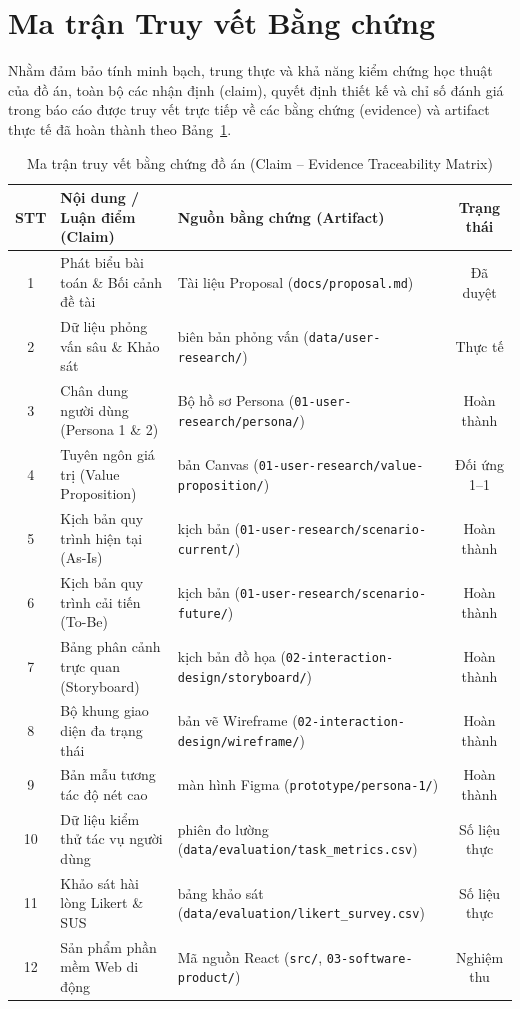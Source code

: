 \newpage
\appendix
\section{Ma trận Truy vết Bằng chứng}

Nhằm đảm bảo tính minh bạch, trung thực và khả năng kiểm chứng học thuật của đồ án, toàn bộ các nhận định (claim), quyết định thiết kế và chỉ số đánh giá trong báo cáo được truy vết trực tiếp về các bằng chứng (evidence) và artifact thực tế đã hoàn thành theo Bảng~\ref{tab:claim_evidence}.

\begin{table}[H]
\centering
\footnotesize
\setlength{\tabcolsep}{3.5pt}
\renewcommand{\arraystretch}{1.15}
\begin{tabularx}{\textwidth}{|c|>{\raggedright\arraybackslash}p{4.2cm}|>{\raggedright\arraybackslash}X|c|}
\hline
\textbf{STT} & \textbf{Nội dung / Luận điểm (Claim)} & \textbf{Nguồn bằng chứng (Artifact)} & \textbf{Trạng thái} \\ \hline
1 & Phát biểu bài toán \& Bối cảnh đề tài & Tài liệu Proposal (\texttt{docs/proposal.md}) & Đã duyệt \\ \hline
2 & Dữ liệu phỏng vấn sâu \& Khảo sát & 6 biên bản phỏng vấn (\texttt{data/user-research/}) & Thực tế \\ \hline
3 & Chân dung người dùng (Persona 1 \& 2) & Bộ hồ sơ Persona (\texttt{01-user-research/persona/}) & Hoàn thành \\ \hline
4 & Tuyên ngôn giá trị (Value Proposition) & 2 bản Canvas (\texttt{01-user-research/value-proposition/}) & Đối ứng 1--1 \\ \hline
5 & Kịch bản quy trình hiện tại (As-Is) & 7 kịch bản (\texttt{01-user-research/scenario-current/}) & Hoàn thành \\ \hline
6 & Kịch bản quy trình cải tiến (To-Be) & 7 kịch bản (\texttt{01-user-research/scenario-future/}) & Hoàn thành \\ \hline
7 & Bảng phân cảnh trực quan (Storyboard) & 4 kịch bản đồ họa (\texttt{02-interaction-design/storyboard/}) & Hoàn thành \\ \hline
8 & Bộ khung giao diện đa trạng thái & 32 bản vẽ Wireframe (\texttt{02-interaction-design/wireframe/}) & Hoàn thành \\ \hline
9 & Bản mẫu tương tác độ nét cao & 20 màn hình Figma (\texttt{prototype/persona-1/}) & Hoàn thành \\ \hline
10 & Dữ liệu kiểm thử tác vụ người dùng & 20 phiên đo lường (\texttt{data/evaluation/task\_metrics.csv}) & Số liệu thực \\ \hline
11 & Khảo sát hài lòng Likert \& SUS & 5 bảng khảo sát (\texttt{data/evaluation/likert\_survey.csv}) & Số liệu thực \\ \hline
12 & Sản phẩm phần mềm Web di động & Mã nguồn React (\texttt{src/}, \texttt{03-software-product/}) & Nghiệm thu \\ \hline
\end{tabularx}
\caption{Ma trận truy vết bằng chứng đồ án (Claim -- Evidence Traceability Matrix)}
\label{tab:claim_evidence}
\end{table}

